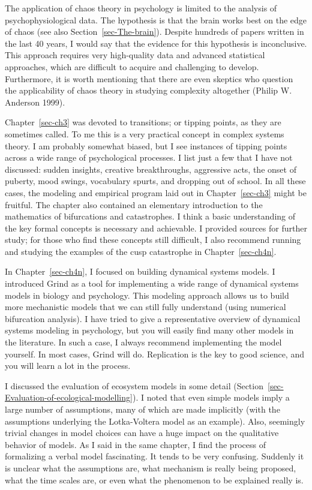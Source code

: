 \documentclass[
  a4paper,
  DIV=11,
  numbers=noendperiod]{scrreprt}
\begin{document}
The application of chaos theory in psychology is limited to the analysis
of psychophysiological data. The hypothesis is that the brain works best
on the edge of chaos (see also Section~\ref{sec-The-brain}). Despite
hundreds of papers written in the last 40 years, I would say that the
evidence for this hypothesis is inconclusive. This approach requires
very high-quality data and advanced statistical approaches, which are
difficult to acquire and challenging to develop. Furthermore, it is
worth mentioning that there are even skeptics who question the
applicability of chaos theory in studying complexity altogether (Philip
W. Anderson 1999).

Chapter~\ref{sec-ch3} was devoted to transitions; or tipping points, as
they are sometimes called. To me this is a very practical concept in
complex systems theory. I am probably somewhat biased, but I see
instances of tipping points across a wide range of psychological
processes. I list just a few that I have not discussed: sudden insights,
creative breakthroughs, aggressive acts, the onset of puberty, mood
swings, vocabulary spurts, and dropping out of school. In all these
cases, the modeling and empirical program laid out in
Chapter~\ref{sec-ch3} might be fruitful. The chapter also contained an
elementary introduction to the mathematics of bifurcations and
catastrophes. I think a basic understanding of the key formal concepts
is necessary and achievable. I provided sources for further study; for
those who find these concepts still difficult, I also recommend running
and studying the examples of the cusp catastrophe in
Chapter~\ref{sec-ch4n}.

In Chapter~\ref{sec-ch4n}, I focused on building dynamical systems
models. I introduced Grind as a tool for implementing a wide range of
dynamical systems models in biology and psychology. This modeling
approach allows us to build more mechanistic models that we can still
fully understand (using numerical bifurcation analysis). I have tried to
give a representative overview of dynamical systems modeling in
psychology, but you will easily find many other models in the
literature. In such a case, I always recommend implementing the model
yourself. In most cases, Grind will do. Replication is the key to good
science, and you will learn a lot in the process.

I discussed the evaluation of ecosystem models in some detail
(Section~\ref{sec-Evaluation-of-ecological-modelling}). I noted that
even simple models imply a large number of assumptions, many of which
are made implicitly (with the assumptions underlying the Lotka-Voltera
model as an example). Also, seemingly trivial changes in model choices
can have a huge impact on the qualitative behavior of models. As I said
in the same chapter, I find the process of formalizing a verbal model
fascinating. It tends to be very confusing. Suddenly it is unclear what
the assumptions are, what mechanism is really being proposed, what the
time scales are, or even what the phenomenon to be explained really is.
\end{document}
